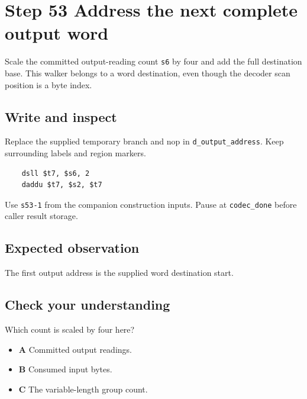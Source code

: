 \section{Step 53 Address the next complete output word}\label{delta-s53}

Scale the committed output-reading count \texttt{s6} by four and add the full destination base. This walker belongs to a word destination, even though the decoder scan position is a byte index.

\subsection{Write and inspect}
Replace the supplied temporary branch and nop in \texttt{d\_output\_address}. Keep surrounding labels and region markers.

\begin{verbatim}
    dsll $t7, $s6, 2
    daddu $t7, $s2, $t7
\end{verbatim}
Use \texttt{s53-1} from the companion construction inputs. Pause at \texttt{codec\_done} before caller result storage.

\subsection{Expected observation}
The first output address is the supplied word destination start.

\subsection{Check your understanding}
Which count is scaled by four here?

\begin{itemize}
  \item \textbf{A} Committed output readings.
  \item \textbf{B} Consumed input bytes.
  \item \textbf{C} The variable-length group count.
\end{itemize}
